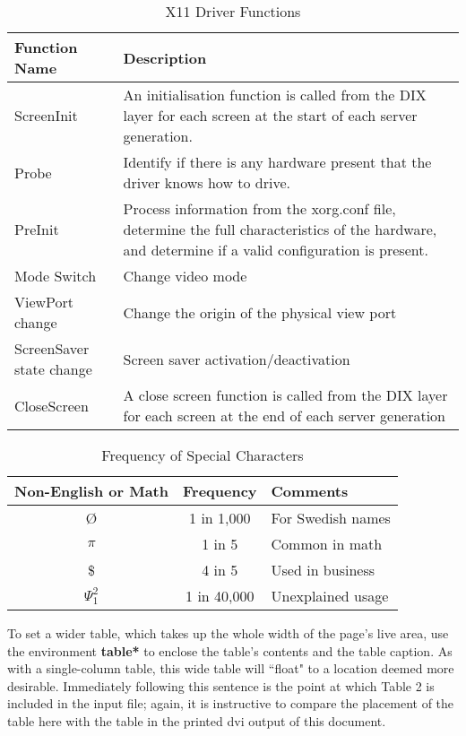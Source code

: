 \documentclass{acm_proc_article-sp}
\begin{document}
\begin{table}
 \centering
  \caption{X11 Driver Functions}
  \begin{tabular}{|l|p{4cm}|} \hline
  \textbf{Function Name}&\textbf{Description}\\ \hline
  ScreenInit & An initialisation function is called from the DIX layer for each screen at the start of each server generation.\\ \hline
  Probe & Identify if there is any hardware present that the driver knows how to drive.\\ \hline
  PreInit & Process information from the xorg.conf file, determine the full characteristics of the hardware, and determine if a valid configuration is present. \\ \hline
  Mode Switch & Change video mode \\ \hline
  ViewPort change & Change the origin of the physical view port \\ \hline
  ScreenSaver state change & Screen saver activation/deactivation \\ \hline
  CloseScreen & A close screen function is called from the DIX layer for each screen at the end of each server generation \\ \hline
\end{tabular}
\end{table}

\begin{table}
\centering
\caption{Frequency of Special Characters}
\begin{tabular}{|c|c|l|} \hline
Non-English or Math&Frequency&Comments\\ \hline
\O & 1 in 1,000& For Swedish names\\ \hline
$\pi$ & 1 in 5& Common in math\\ \hline
\$ & 4 in 5 & Used in business\\ \hline
$\Psi^2_1$ & 1 in 40,000& Unexplained usage\\
\hline\end{tabular}
\end{table}

To set a wider table, which takes up the whole width of
the page's live area, use the environment
\textbf{table*} to enclose the table's contents and
the table caption.  As with a single-column table, this wide
table will ``float" to a location deemed more desirable.
Immediately following this sentence is the point at which
Table 2 is included in the input file; again, it is
instructive to compare the placement of the
table here with the table in the printed dvi
output of this document.
\end{document}
